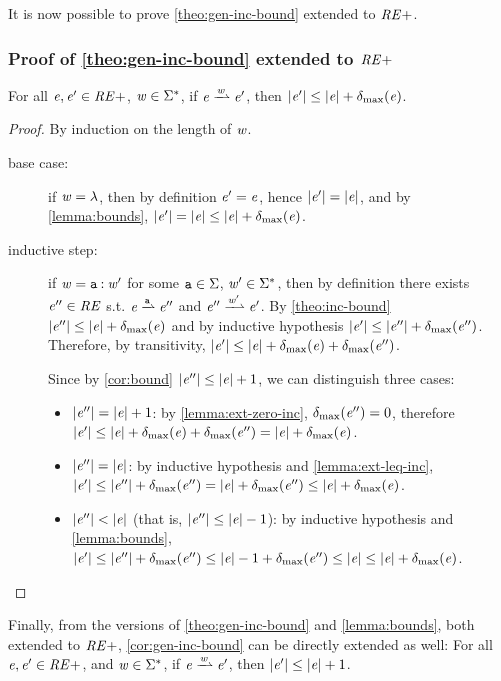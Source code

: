 It is now possible to prove \cref{theo:gen-inc-bound} extended to $\mathit {RE+}$.

\subsubsection*{Proof of \cref{theo:gen-inc-bound} extended to $\mathit {RE+}$
}
For all $\mathit {e},\mathit {e}'\in\mathit {RE+}$, $\mathit {w}\in\Sigma^*$, if $\re\parDer{\word}\re'$, then ${\mid}{\mathit {e}'}{\mid}\leq {\mid}{\ensuremath{\mathit {e}}}{\mid}+{\delta_{\max}}({\mathit {e}})$.

\begin{proof}
 By induction on the length of $\mathit {w}$.
 \begin{description}
  \item[base case:] if $\mathit {w}=\lambda$, then by definition $\mathit {e}'=\mathit {e}$, hence
   ${\mid}{\mathit {e}'}{\mid}={\mid}{\mathit {e}}{\mid}$, and by \cref{lemma:bounds}, ${\mid}{\mathit {e}'}{\mid}={\mid}{\mathit {e}}{\mid}\leq{\mid}{\ensuremath{\mathit {e}}}{\mid}+{\delta_{\max}}({\mathit {e}})$.

  \item[inductive step:]
   if $\mathit {w}=\mathtt {a}\mathbin{:}\mathit {w}'$ for some $\mathtt {a}\in\Sigma$, $\mathit {w}'\in\Sigma^*$, then by definition there exists $\mathit {e}''\in\mathit {RE}$ s.t. $\re\parDer{\sym}\re''$ and $\re''\parDer{\word'}\re'$. By \cref{theo:inc-bound} ${\mid}{\mathit {e}''}{\mid}\leq{\mid}{\ensuremath{\mathit {e}}}{\mid}+{\delta_{\max}}({\mathit {e}})$ and by inductive hypothesis ${\mid}{\mathit {e}'}{\mid}\leq{\mid}{\ensuremath{\mathit {e}}''}{\mid}+{\delta_{\max}}({\mathit {e}''})$. Therefore,
   by transitivity,  ${\mid}{\mathit {e}'}{\mid}\leq{\mid}{\ensuremath{\mathit {e}}}{\mid}+{\delta_{\max}}({\mathit {e}})+{\delta_{\max}}({\mathit {e}''})$.

   Since by \cref{cor:bound} ${\mid}{\mathit {e}''}{\mid}\leq{\mid}{\ensuremath{\mathit {e}}}{\mid}+1$, we can distinguish three cases:
   \begin{itemize}
    \item ${\mid}{\mathit {e}''}{\mid}={\mid}{\mathit {e}}{\mid}+1$: by \cref{lemma:ext-zero-inc}, ${\delta_{\max}}({\mathit {e}''})=0$,
          therefore ${\mid}{\mathit {e}'}{\mid}\leq{\mid}{\ensuremath{\mathit {e}}}{\mid}+{\delta_{\max}}({\mathit {e}})+{\delta_{\max}}({\mathit {e}''})={\mid}{\mathit {e}}{\mid}+{\delta_{\max}}({\mathit {e}})$.
    \item ${\mid}{\mathit {e}''}{\mid}={\mid}{\mathit {e}}{\mid}$: by inductive hypothesis and \cref{lemma:ext-leq-inc},
          ${\mid}{\mathit {e}'}{\mid}\leq{\mid}{\ensuremath{\mathit {e}}''}{\mid}+{\delta_{\max}}({\mathit {e}''})={\mid}{\mathit {e}}{\mid}+{\delta_{\max}}({\mathit {e}''})\leq{\mid}{\ensuremath{\mathit {e}}}{\mid}+{\delta_{\max}}({\mathit {e}})$.
    \item ${\mid}{\mathit {e}''}{\mid}<{\mid}{\mathit {e}}{\mid}$ (that is, ${\mid}{\mathit {e}''}{\mid}\leq{\mid}{\ensuremath{\mathit {e}}}{\mid}-1$): by inductive hypothesis and \cref{lemma:bounds},
          ${\mid}{\mathit {e}'}{\mid}\leq{\mid}{\ensuremath{\mathit {e}}''}{\mid}+{\delta_{\max}}({\mathit {e}''})\leq{\mid}{\ensuremath{\mathit {e}}}{\mid}-1+{\delta_{\max}}({\mathit {e}''})\leq{\mid}{\ensuremath{\mathit {e}}}{\mid}\leq{\mid}{\ensuremath{\mathit {e}}}{\mid}+{\delta_{\max}}({\mathit {e}})$.
   \end{itemize}
 \end{description}
\end{proof}

Finally, from the versions of \cref{theo:gen-inc-bound} and \cref{lemma:bounds}, both extended to $\mathit {RE+}$, \cref{cor:gen-inc-bound} can be directly extended as well: For all $\mathit {e},\mathit {e}'\in\mathit {RE+}$, and $\mathit {w}\in\Sigma^*$, if $\re\parDer{\word}\re'$, then ${\mid}{\mathit {e}'}{\mid}\leq{\mid}{\ensuremath{\mathit {e}}}{\mid}+1$.